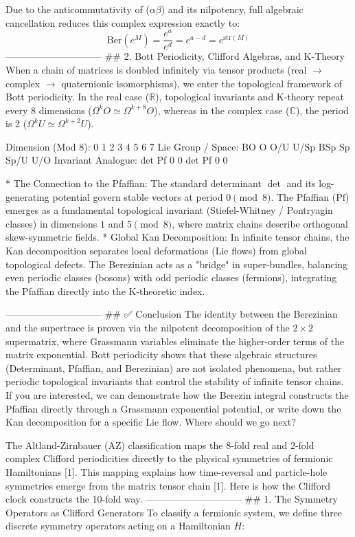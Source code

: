 Due to the anticommutativity of ($\alpha\beta$) and its nilpotency, full algebraic cancellation reduces this complex expression exactly to:
$$\text{Ber}(e^M) = \frac{e^a}{e^d} = e^{a-d} = e^{\text{str}(M)}$$ 
------------------------------
## 2. Bott Periodicity, Clifford Algebras, and K-Theory
When a chain of matrices is doubled infinitely via tensor products (real $\rightarrow$ complex $\rightarrow$ quaternionic isomorphisms), we enter the topological framework of Bott periodicity.
In the real case ($\mathbb{R}$), topological invariants and K-theory repeat every 8 dimensions ($\Omega^k O \simeq \Omega^{k+8} O$), whereas in the complex case ($\mathbb{C}$), the period is 2 ($\Omega^k U \simeq \Omega^{k+2} U$).

Dimension (Mod 8):  0     1     2     3     4     5     6     7
Lie Group / Space:  BO    O     O/U   U/Sp  BSp   Sp    Sp/U  U/O
Invariant Analogue: det   Pf    0     0     det   Pf    0     0


* The Connection to the Pfaffian: The standard determinant $\det$ and its log-generating potential govern stable vectors at period $0 \pmod 8$. The Pfaffian ($\text{Pf}$) emerges as a fundamental topological invariant (Stiefel-Whitney / Pontryagin classes) in dimensions $1$ and $5 \pmod 8$, where matrix chains describe orthogonal skew-symmetric fields.
* Global Kan Decomposition: In infinite tensor chains, the Kan decomposition separates local deformations (Lie flows) from global topological defects. The Berezinian acts as a "bridge" in super-bundles, balancing even periodic classes (bosons) with odd periodic classes (fermions), integrating the Pfaffian directly into the K-theoretic index.

------------------------------
## ✅ Conclusion
The identity between the Berezinian and the supertrace is proven via the nilpotent decomposition of the $2 \times 2$ supermatrix, where Grassmann variables eliminate the higher-order terms of the matrix exponential. Bott periodicity shows that these algebraic structures (Determinant, Pfaffian, and Berezinian) are not isolated phenomena, but rather periodic topological invariants that control the stability of infinite tensor chains.
If you are interested, we can demonstrate how the Berezin integral constructs the Pfaffian directly through a Grassmann exponential potential, or write down the Kan decomposition for a specific Lie flow. Where should we go next?



The Altland-Zirnbauer (AZ) classification maps the 8-fold real and 2-fold complex Clifford periodicities directly to the physical symmetries of fermionic Hamiltonians [1]. This mapping explains how time-reversal and particle-hole symmetries emerge from the matrix tensor chain [1].
Here is how the Clifford clock constructs the 10-fold way.
------------------------------
## 1. The Symmetry Operators as Clifford Generators
To classify a fermionic system, we define three discrete symmetry operators acting on a Hamiltonian $H$:

